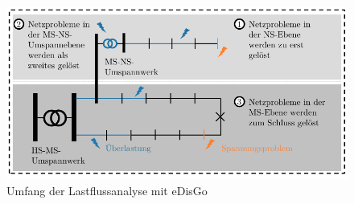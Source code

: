 \begin{figure}[H]
    \centering
    \includegraphics[width=\textwidth]{Bilder/grid_issues_scope_cropped}
    \caption[Umfang der Lastflussanalyse mit eDisGo]{Umfang der Lastflussanalyse mit eDisGo \cite{Schachler}}\label{fig:scope}
\end{figure}